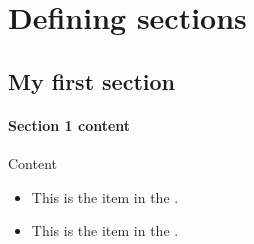 \setcounter{chapter}{3}
\chapter{Defining sections}
\label{chap:defining_sections}

\section{My first section}

\begin{frame}
\frametitle{Section 1 content}
\begin{block}{Content}
\begin{itemize}
\item This is the  item in the .
\item This is the  item in the .
\end{itemize}
\end{block}
\end{frame}


